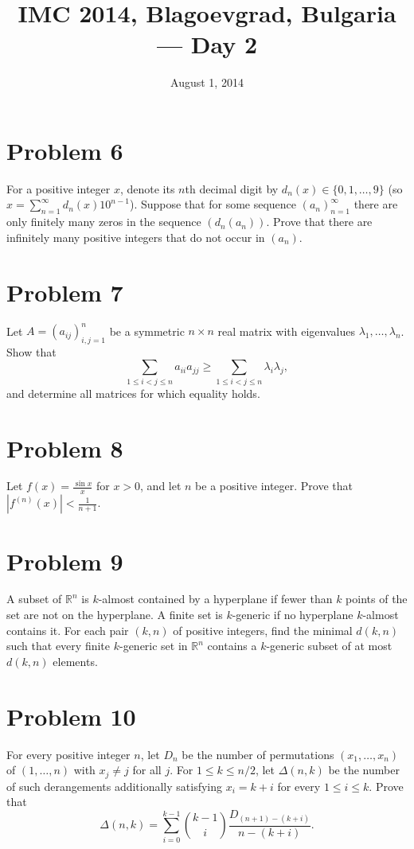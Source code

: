 \documentclass{article}
\title{IMC 2014, Blagoevgrad, Bulgaria --- Day 2}
\date{August 1, 2014}
\begin{document}
\maketitle

\section*{Problem 6}
For a positive integer $x$, denote its $n$th decimal digit by $d_n(x) \in \{0,1,\dots,9\}$ (so $x = \sum_{n=1}^\infty d_n(x) 10^{n-1}$). Suppose that for some sequence $(a_n)_{n=1}^\infty$ there are only finitely many zeros in the sequence $(d_n(a_n))$. Prove that there are infinitely many positive integers that do not occur in $(a_n)$.

\section*{Problem 7}
Let $A = (a_{ij})_{i,j=1}^n$ be a symmetric $n \times n$ real matrix with eigenvalues $\lambda_1, \dots, \lambda_n$. Show that
\[ \sum_{1 \le i < j \le n} a_{ii} a_{jj} \ge \sum_{1 \le i < j \le n} \lambda_i \lambda_j, \]
and determine all matrices for which equality holds.

\section*{Problem 8}
Let $f(x) = \frac{\sin x}{x}$ for $x > 0$, and let $n$ be a positive integer. Prove that $|f^{(n)}(x)| < \frac{1}{n+1}$.

\section*{Problem 9}
A subset of $\mathbb{R}^n$ is $k$-almost contained by a hyperplane if fewer than $k$ points of the set are not on the hyperplane. A finite set is $k$-generic if no hyperplane $k$-almost contains it. For each pair $(k, n)$ of positive integers, find the minimal $d(k, n)$ such that every finite $k$-generic set in $\mathbb{R}^n$ contains a $k$-generic subset of at most $d(k, n)$ elements.

\section*{Problem 10}
For every positive integer $n$, let $D_n$ be the number of permutations $(x_1, \dots, x_n)$ of $(1, \dots, n)$ with $x_j \ne j$ for all $j$. For $1 \le k \le n/2$, let $\Delta(n, k)$ be the number of such derangements additionally satisfying $x_i = k+i$ for every $1 \le i \le k$. Prove that
\[ \Delta(n, k) = \sum_{i=0}^{k-1} \binom{k-1}{i} \frac{D_{(n+1)-(k+i)}}{n - (k+i)}. \]
\end{document}

